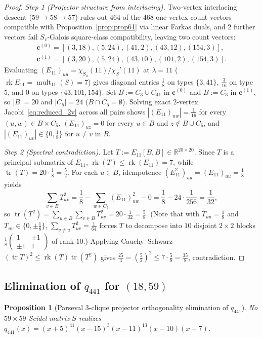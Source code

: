\documentclass[11pt,reqno]{amsart}
\newtheorem{proposition}[theorem]{Proposition}
\theoremstyle{definition}
\theoremstyle{remark}
\numberwithin{equation}{section}
\numberwithin{table}{section}
\DeclareMathOperator{\tr}{tr}
\DeclareMathOperator{\rk}{rk}
\DeclareMathOperator{\mult}{mult}
\begin{document}
\begin{proof}
\emph{Step 1 (Projector structure from interlacing).}
Two-vertex interlacing descent ($59 \to 58 \to 57$) rules out $464$ of the $468$ one-vertex count vectors compatible with Proposition~\ref{prop:prop61} via linear Farkas duals, and $2$ further vectors fail $S_v$-Galois square-class compatibility, leaving two count vectors:
\begin{gather*}
  \mathbf{c}^{(0)} = [(3, 18), (5, 24), (41, 2), (43, 12), (154, 3)], \\
  \mathbf{c}^{(1)} = [(3, 20), (5, 24), (43, 10), (101, 2), (154, 3)].
\end{gather*}
Evaluating $(E_{11})_{uu} = \chi_{S_u}(11)/\chi_S'(11)$ at $\lambda = 11$ ($\rk E_{11} = \mult_{11}(S) = 7$) gives diagonal entries $\frac{1}{8}$ on types $\{3, 41\}$, $\frac{3}{16}$ on type~$5$, and $0$ on types $\{43, 101, 154\}$. Set $B := C_3 \cup C_{41}$ in $\mathbf{c}^{(0)}$ and $B := C_3$ in $\mathbf{c}^{(1)}$, so $|B| = 20$ and $|C_5| = 24$ ($B \cap C_5 = \emptyset$). Solving exact $2$-vertex Jacobi~\eqref{eq:reduced_2v} across all pairs shows $|(E_{11})_{uw}| = \frac{1}{16}$ for every $(u, w) \in B \times C_5$, $(E_{11})_{uz} = 0$ for every $u \in B$ and $z \notin B \cup C_5$, and $|(E_{11})_{uv}| \in \{0, \frac{1}{8}\}$ for $u \neq v$ in $B$.

\emph{Step 2 (Spectral contradiction).}
Let $T := E_{11}[B, B] \in \mathbb{R}^{20 \times 20}$. Since $T$ is a principal submatrix of $E_{11}$, $\rk(T) \le \rk(E_{11}) = 7$, while $\tr(T) = 20 \cdot \frac{1}{8} = \frac{5}{2}$. For each $u \in B$, idempotence $(E_{11}^2)_{uu} = (E_{11})_{uu} = \frac{1}{8}$ yields
\[
  \sum_{v \in B} T_{uv}^2 = \frac{1}{8} - \sum_{w \in C_5} (E_{11})_{uw}^2 - 0 = \frac{1}{8} - 24 \cdot \frac{1}{256} = \frac{1}{32},
\]
so $\tr(T^2) = \sum_{u \in B}\sum_{v \in B} T_{uv}^2 = 20 \cdot \frac{1}{32} = \frac{5}{8}$. (Note that with $T_{uu} = \frac{1}{8}$ and $T_{uv} \in \{0, \pm \frac{1}{8}\}$, $\sum_{v \neq u} T_{uv}^2 = \frac{1}{64}$ forces $T$ to decompose into $10$ disjoint $2 \times 2$ blocks $\frac{1}{8}\left(\begin{smallmatrix}1 & \pm 1 \\ \pm 1 & 1\end{smallmatrix}\right)$ of rank $10$.) Applying Cauchy--Schwarz $(\tr T)^2 \le \rk(T)\tr(T^2)$ gives $\frac{25}{4} = (\frac{5}{2})^2 \le 7 \cdot \frac{5}{8} = \frac{35}{8}$, contradiction.
\end{proof}

\subsection{Elimination of \texorpdfstring{$q_{441}$}{q\_441} for \texorpdfstring{$(18, 59)$}{(18, 59)}}
\begin{proposition}[Parseval $3$-clique projector orthogonality elimination of $q_{441}$]\label{prop:kill441}
No $59 \times 59$ Seidel matrix $S$ realizes $q_{441}(x) = (x + 5)^{41}(x - 15)^3(x - 11)^{13}(x - 10)(x - 7)$.
\end{proposition}
\end{document}
